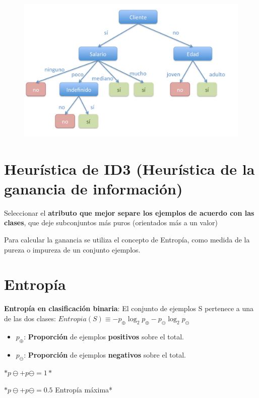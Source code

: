 \documentclass[12pt]{report} %
\begin{document}
\begin{figure}[H]
	{\includegraphics[scale=.2]{Untitled 9.png}}
\end{figure}


\section{Heurística de ID3 (Heurística de la ganancia de
información)}

Seleccionar el \textbf{atributo que mejor separe los ejemplos de acuerdo
con las clases}, que deje subconjuntos más puros (orientados más a un
valor)

Para calcular la ganancia se utiliza el concepto de Entropía, como
medida de la pureza o impureza de un conjunto ejemplos.
\newpage
\section{Entropía}

\textbf{Entropía en clasificación binaria}: El conjunto de ejemplos S
pertenece a una de las dos clases:
\textbf{\(Entropia(S) \equiv -p_\oplus \log _2 p_\oplus -p_\ominus \log _2 p_\ominus\)}

\begin{itemize}
\item
  \(p_\oplus\): \textbf{Proporción} de ejemplos \textbf{positivos} sobre
  el total.
\item
  \(p_\ominus\): \textbf{Proporción} de ejemplos \textbf{negativos}
  sobre el total.
\end{itemize}

\(*p\ominus+p\ominus=1*\)

\(*p\ominus+p\ominus=0.5\) Entropía máxima*
\end{document}
